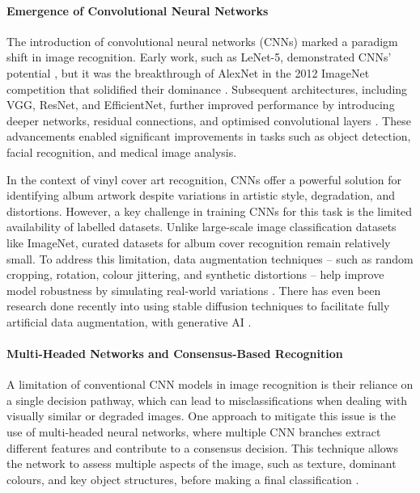             \paragraph{Emergence of Convolutional Neural Networks}
            
                The introduction of convolutional neural networks (CNNs) marked a paradigm shift in image recognition. Early work, such as LeNet-5, demonstrated CNNs' potential \cite{726791}, but it was the breakthrough of AlexNet in the 2012 ImageNet competition that solidified their dominance \cite{imagenetclasscnn}. Subsequent architectures, including VGG, ResNet, and EfficientNet, further improved performance by introducing deeper networks, residual connections, and optimised convolutional layers \cite{deppcnnsforimagerecognition}. These advancements enabled significant improvements in tasks such as object detection, facial recognition, and medical image analysis.
    
                In the context of vinyl cover art recognition, CNNs offer a powerful solution for identifying album artwork despite variations in artistic style, degradation, and distortions. However, a key challenge in training CNNs for this task is the limited availability of labelled datasets. Unlike large-scale image classification datasets like ImageNet, curated datasets for album cover recognition remain relatively small. To address this limitation, data augmentation techniques -- such as random cropping, rotation, colour jittering, and synthetic distortions -- help improve model robustness by simulating real-world variations \cite{LIN2025102660}. There has even been research done recently into using stable diffusion techniques to facilitate fully artificial data augmentation, with generative AI \cite{Alimisis2025}.
    
            \paragraph{Multi-Headed Networks and Consensus-Based Recognition}
    
                A limitation of conventional CNN models in image recognition is their reliance on a single decision pathway, which can lead to misclassifications when dealing with visually similar or degraded images. One approach to mitigate this issue is the use of multi-headed neural networks, where multiple CNN branches extract different features and contribute to a consensus decision. This technique allows the network to assess multiple aspects of the image, such as texture, dominant colours, and key object structures, before making a final classification \cite{Zheng2017}. 
            
